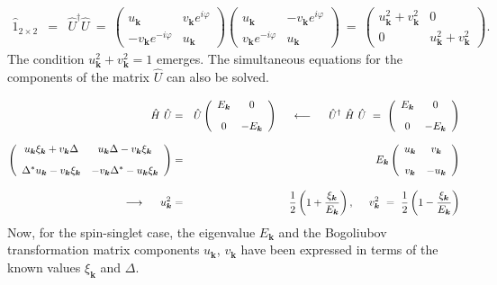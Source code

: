 \documentclass[uplatex,a4j,12pt,dvipdfmx]{jsarticle}
\begin{document}
\begin{eqnarray}
	\hat{1}_{2 \times 2}
	&=&
	\hat{U}^{\dagger}
	\hat{U}
	\ = \
	\left(
	\begin{array}{cc}
			u_{\bm{k}}                   & v_{\bm{k}} e^{i \varphi}
			\\[3mm]
			- v_{\bm{k}} e^{- i \varphi} & u_{\bm{k}}
		\end{array}
	\right)
	\!\!\!
	\left(
	\begin{array}{cc}
			u_{\bm{k}}                 & - v_{\bm{k}} e^{i \varphi}
			\\[3mm]
			v_{\bm{k}} e^{- i \varphi} & u_{\bm{k}}
		\end{array}
	\right)
	\ = \
	\left(
	\begin{array}{cc}
			u_{\bm{k}}^{2} + v_{\bm{k}}^{2} & 0
			\\[3mm]
			0                               & u_{\bm{k}}^{2} + v_{\bm{k}}^{2}
		\end{array}
	\right)
	.
\end{eqnarray}
%
The condition $u_{\bm{k}}^{2} + v_{\bm{k}}^{2} = 1$ emerges.
The simultaneous equations for the components of the matrix $\hat{U}$ can also be solved.

\begin{eqnarray}
	\hat{H}
	\
	\hat{U}
	&=&
	\hat{U}
	\left(
	\begin{array}{cc}
			E_{\bm{k}} & 0
			\\[3mm]
			0          & - E_{\bm{k}}
		\end{array}
	\right)
	\hspace{5mm}
	\longleftarrow
	\hspace{5mm}
	\hat{U}^{\dagger}
	\
	\hat{H}
	\
	\hat{U}
	\ = \
	\left(
	\begin{array}{cc}
			E_{\bm{k}} & 0
			\\[3mm]
			0          & - E_{\bm{k}}
		\end{array}
	\right)
	\\[2mm]
	\left(
	\begin{array}{cc}
			u_{\bm{k}} \xi_{\bm{k}} + v_{\bm{k}} \Delta     & u_{\bm{k}} \Delta - v_{\bm{k}} \xi_{\bm{k}}
			\\[3mm]
			\Delta^{*} u_{\bm{k}} - v_{\bm{k}} \xi_{\bm{k}} & - v_{\bm{k}} \Delta^{*} - u_{\bm{k}} \xi_{\bm{k}}
		\end{array}
	\right)
	&=&
	E_{\bm{k}}
	\left(
	\begin{array}{cc}
			u_{\bm{k}} & v_{\bm{k}}
			\\[3mm]
			v_{\bm{k}} & - u_{\bm{k}}
		\end{array}
	\right)
	\\[3mm]
	\longrightarrow
	\hspace{5mm}
	u_{\bm{k}}^{2}
	&=&
	\dfrac{1}{2} \left( 1 + \dfrac{\xi_{\bm{k}}}{E_{\bm{k}}} \right)
	, \hspace{5mm}
	v_{\bm{k}}^{2}
	\ = \
	\dfrac{1}{2} \left( 1 - \dfrac{\xi_{\bm{k}}}{E_{\bm{k}}} \right)
\end{eqnarray}
%
Now, for the spin-singlet case, the eigenvalue $E_{\bm{k}}$ and the Bogoliubov transformation matrix components $u_{\bm{k}}$, $v_{\bm{k}}$ have been expressed in terms of the known values $\xi_{\bm{k}}$ and $\Delta$.
\end{document}

